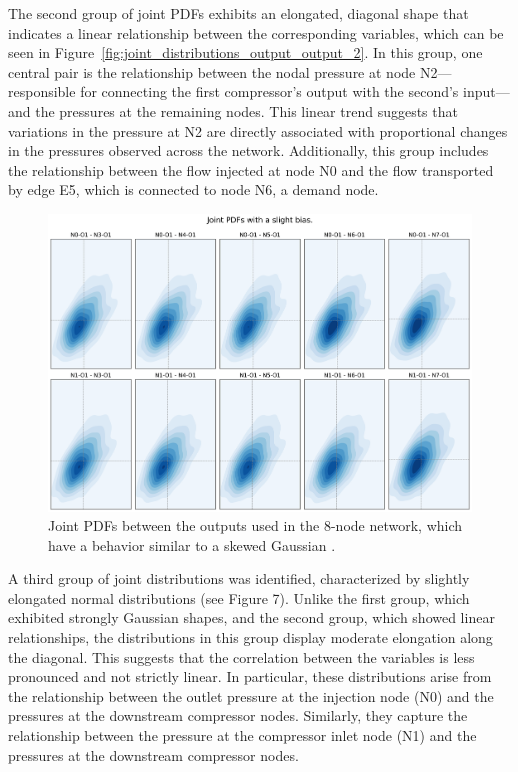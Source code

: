 The second group of joint PDFs exhibits an elongated, diagonal shape that indicates a linear relationship between the corresponding variables, which can be seen in Figure~\cref{fig:joint_distributions_output_output_2}. In this group, one central pair is the relationship between the nodal pressure at node N2—responsible for connecting the first compressor's output with the second's input—and the pressures at the remaining nodes. This linear trend suggests that variations in the pressure at N2 are directly associated with proportional changes in the pressures observed across the network. Additionally, this group includes the relationship between the flow injected at node N0 and the flow transported by edge E5, which is connected to node N6, a demand node.  


\begin{figure}
    \begin{center}
        \includegraphics[width=.67\textwidth]{figures/Chapter_NonLinealCensnet/outputs_outputs_3.png}
    \end{center}
    \caption{Joint PDFs between the outputs used in the 8-node network, which have a behavior similar to a skewed Gaussian . }\label{fig:joint_distributions_output_output_3}
\end{figure}
 


A third group of joint distributions was identified, characterized by slightly elongated normal distributions (see Figure 7). Unlike the first group, which exhibited strongly Gaussian shapes, and the second group, which showed linear relationships, the distributions in this group display moderate elongation along the diagonal. This suggests that the correlation between the variables is less pronounced and not strictly linear. In particular, these distributions arise from the relationship between the outlet pressure at the injection node (N0) and the pressures at the downstream compressor nodes. Similarly, they capture the relationship between the pressure at the compressor inlet node (N1) and the pressures at the downstream compressor nodes.


